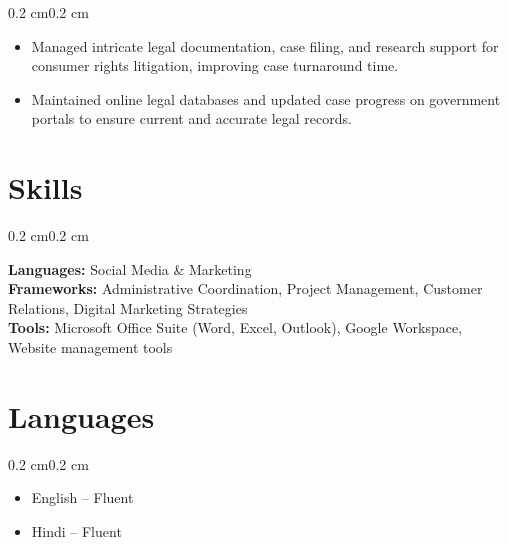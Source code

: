 \documentclass[10pt, letterpaper]{article}
\newenvironment{highlights}{%
    \begin{itemize}[
        topsep=0.10 cm,%
        parsep=0.10 cm,%
        partopsep=0pt,%
        itemsep=0pt,%
        leftmargin=0.4 cm + 10pt%
    ]
}{%
    \end{itemize}%
}
\newenvironment{onecolentry}{%
    \begin{adjustwidth}{0.2 cm}{0.2 cm}%
}{%
    \end{adjustwidth}%
}
\begin{document}
\vspace{0.10 cm}
\begin{onecolentry}
    \begin{highlights}
        \item Managed intricate legal documentation, case filing, and research support for consumer rights litigation, improving case turnaround time.
        \item Maintained online legal databases and updated case progress on government portals to ensure current and accurate legal records.
    \end{highlights}
\end{onecolentry}
\vspace{0.2 cm}




\section{Skills}
\begin{onecolentry}
    \textbf{Languages:} Social Media \& Marketing\\
    \textbf{Frameworks:} Administrative Coordination, Project Management, Customer Relations, Digital Marketing Strategies\\
    \textbf{Tools:} Microsoft Office Suite (Word, Excel, Outlook), Google Workspace, Website management tools\\
\end{onecolentry}


\section{Languages}
\begin{onecolentry}
    \begin{highlights}
        \item English -- Fluent
        \item Hindi -- Fluent
    \end{highlights}
\end{onecolentry}
\end{document}
